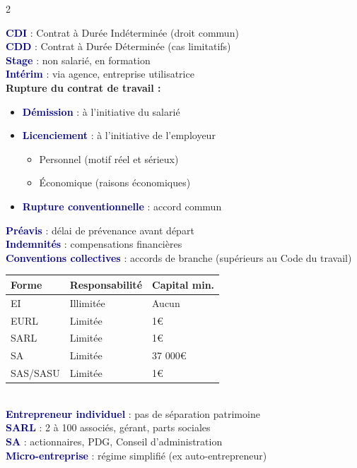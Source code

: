 \documentclass[a4paper,10pt]{article}
\newcommand{\key}[1]{\textbf{\textcolor{darkblue}{#1}}}
\begin{document}
\begin{multicols}{2}
\begin{tcolorbox}[basebox, colframe=crimson, title=6. DROIT — Droit du travail]
\key{CDI} : Contrat à Durée Indéterminée (droit commun) \\
\key{CDD} : Contrat à Durée Déterminée (cas limitatifs) \\
\key{Stage} : non salarié, en formation \\
\key{Intérim} : via agence, entreprise utilisatrice \\[4pt]
\textbf{Rupture du contrat de travail :}
\begin{itemize}
  \item \key{Démission} : à l'initiative du salarié
  \item \key{Licenciement} : à l'initiative de l'employeur
    \begin{itemize}
      \item Personnel (motif réel et sérieux)
      \item Économique (raisons économiques)
    \end{itemize}
  \item \key{Rupture conventionnelle} : accord commun
\end{itemize}
\vspace{4pt}
\key{Préavis} : délai de prévenance avant départ \\
\key{Indemnités} : compensations financières \\
\key{Conventions collectives} : accords de branche (supérieurs au Code du travail)
\end{tcolorbox}

\begin{tcolorbox}[basebox, colframe=green, title=7. MANAGEMENT — Entreprise et formes juridiques]
\begin{tabular}{lll}
\toprule
\textbf{Forme} & \textbf{Responsabilité} & \textbf{Capital min.} \\
\midrule
EI & Illimitée & Aucun \\
EURL & Limitée & 1€ \\
SARL & Limitée & 1€ \\
SA & Limitée & 37 000€ \\
SAS/SASU & Limitée & 1€ \\
\bottomrule
\end{tabular}
\vspace{4pt}\\
\key{Entrepreneur individuel} : pas de séparation patrimoine \\
\key{SARL} : 2 à 100 associés, gérant, parts sociales \\
\key{SA} : actionnaires, PDG, Conseil d'administration \\
\key{Micro-entreprise} : régime simplifié (ex auto-entrepreneur)
\end{tcolorbox}


\end{multicols}
\end{document}
